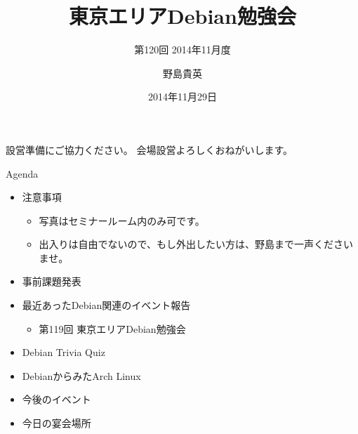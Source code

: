 \title{東京エリアDebian勉強会}
\subtitle{第120回 2014年11月度}
\author{野島貴英}
\date{2014年11月29日}



\begin{frame}
\titlepage{}
\end{frame}

\begin{frame}{設営準備にご協力ください。}
会場設営よろしくおねがいします。
\end{frame}

\begin{frame}{Agenda}
 \begin{minipage}[t]{0.45\hsize}
  \begin{itemize}
   \item 注意事項
	 \begin{itemize}
	  \item 写真はセミナールーム内のみ可です。
          \item 出入りは自由でないので、もし外出したい方は、野島まで一声くださいませ。
	 \end{itemize}
   \item 事前課題発表
  \end{itemize}
 \end{minipage} 
 \begin{minipage}[t]{0.45\hsize}
  \begin{itemize}
   \item 最近あったDebian関連のイベント報告
	 \begin{itemize}
	  \item 第119回 東京エリアDebian勉強会
	 \end{itemize}
   \item Debian Trivia Quiz
   \item DebianからみたArch Linux
   \item 今後のイベント
   \item 今日の宴会場所
  \end{itemize}
 \end{minipage}
\end{frame}

